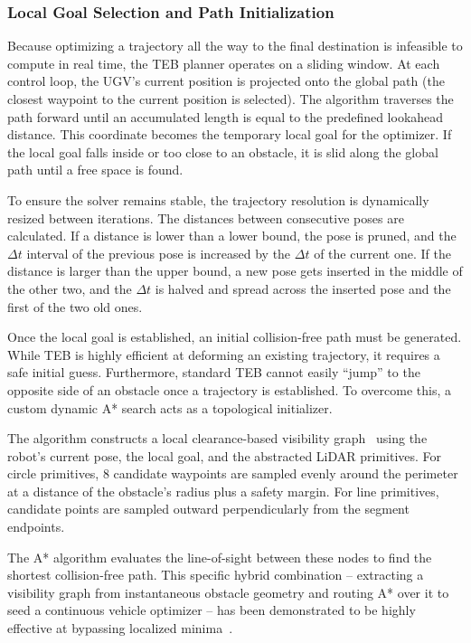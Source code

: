 \subsubsection{Local Goal Selection and Path Initialization}
\label{subsubsec:local-goal}
Because optimizing a trajectory all the way to the final destination is infeasible to compute in real time, the TEB planner operates on a sliding window. At each control loop, the UGV's current position is projected onto the global path (the closest waypoint to the current position is selected). The algorithm traverses the path forward until an accumulated length is equal to the predefined lookahead distance. This coordinate becomes the temporary local goal for the optimizer. If the local goal falls inside or too close to an obstacle, it is slid along the global path until a free space is found.

To ensure the solver remains stable, the trajectory resolution is dynamically resized between iterations. The distances between consecutive poses are calculated. If a distance is lower than a lower bound, the pose is pruned, and the $\Delta t$ interval of the previous pose is increased by the $\Delta t$ of the current one. If the distance is larger than the upper bound, a new pose gets inserted in the middle of the other two, and the $\Delta t$ is halved and spread across the inserted pose and the first of the two old ones.

Once the local goal is established, an initial collision-free path must be generated. While TEB is highly efficient at deforming an existing trajectory, it requires a safe initial guess. Furthermore, standard TEB cannot easily ``jump'' to the opposite side of an obstacle once a trajectory is established. To overcome this, a custom dynamic A* search acts as a topological initializer. 

The algorithm constructs a local clearance-based visibility graph~\cite{lavalle2006planning} using the robot's current pose, the local goal, and the abstracted LiDAR primitives. For circle primitives, 8 candidate waypoints are sampled evenly around the perimeter at a distance of the obstacle's radius plus a safety margin. For line primitives, candidate points are sampled outward perpendicularly from the segment endpoints.

The A* algorithm evaluates the line-of-sight between these nodes to find the shortest collision-free path. This specific hybrid combination -- extracting a visibility graph from instantaneous obstacle geometry and routing A* over it to seed a continuous vehicle optimizer -- has been demonstrated to be highly effective at bypassing localized minima~\cite{karur2021survey, sedighi2019guided}.

